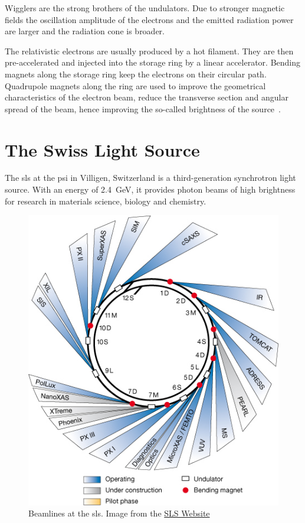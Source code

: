 Wigglers are the strong brothers of the undulators. Due to stronger magnetic fields the oscillation amplitude of the electrons and the emitted radiation power are larger and the radiation cone is broader.

The relativistic electrons are usually produced by a hot filament. They are then pre-accelerated and injected into the storage ring by a linear accelerator. Bending magnets along the storage ring keep the electrons on their circular path. Quadrupole magnets along the ring are used to improve the geometrical characteristics of the electron beam, \ie reduce the transverse section and angular spread of the beam, hence improving the so-called brightness of the source~\cite{Margaritondo2002}.

\section{The Swiss Light Source}
The \ac{sls} at the \ac{psi} in Villigen, Switzerland is a third-generation synchrotron light source. With an energy of \SI{2.4}{\giga\electronvolt}, it provides photon beams of high brightness for research in materials science, biology and chemistry.

\renewcommand{\imsize}{0.618\linewidth}%
\begin{figure}[htb]
	\centering
	\includegraphics[width=\imsize]{img/SLS_beamlines_2008}
	\caption[Beamlines at the Swiss Light Source]{Beamlines at the \ac{sls}. Image from the \href{http://sls.web.psi.ch/view.php/beamlines/}{SLS Website}}
	\label{fig:beamlines}
\end{figure}

